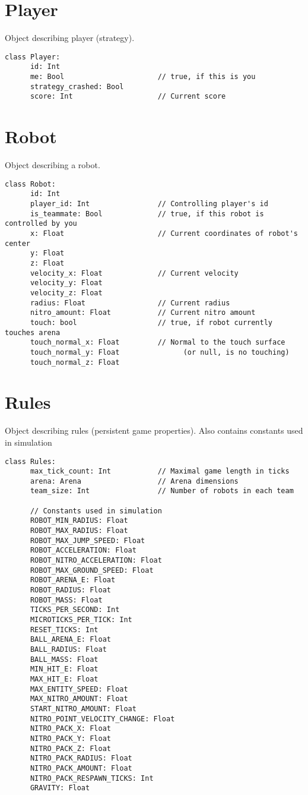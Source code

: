\section{Player}

Object describing player (strategy).

\begin{verbatim}
class Player:
      id: Int
      me: Bool                      // true, if this is you
      strategy_crashed: Bool
      score: Int                    // Current score
\end{verbatim}

\section{Robot}

Object describing a robot.

\begin{verbatim}
class Robot:
      id: Int
      player_id: Int                // Controlling player's id
      is_teammate: Bool             // true, if this robot is controlled by you
      x: Float                      // Current coordinates of robot's center
      y: Float
      z: Float
      velocity_x: Float             // Current velocity
      velocity_y: Float
      velocity_z: Float
      radius: Float                 // Current radius
      nitro_amount: Float           // Current nitro amount
      touch: bool                   // true, if robot currently touches arena
      touch_normal_x: Float         // Normal to the touch surface
      touch_normal_y: Float               (or null, is no touching)
      touch_normal_z: Float
\end{verbatim}

\section{Rules}

Object describing rules (persistent game properties). Also contains constants used in simulation

\begin{verbatim}
class Rules:
      max_tick_count: Int           // Maximal game length in ticks
      arena: Arena                  // Arena dimensions
      team_size: Int                // Number of robots in each team

      // Constants used in simulation
      ROBOT_MIN_RADIUS: Float
      ROBOT_MAX_RADIUS: Float
      ROBOT_MAX_JUMP_SPEED: Float
      ROBOT_ACCELERATION: Float
      ROBOT_NITRO_ACCELERATION: Float
      ROBOT_MAX_GROUND_SPEED: Float
      ROBOT_ARENA_E: Float
      ROBOT_RADIUS: Float
      ROBOT_MASS: Float
      TICKS_PER_SECOND: Int
      MICROTICKS_PER_TICK: Int
      RESET_TICKS: Int
      BALL_ARENA_E: Float
      BALL_RADIUS: Float
      BALL_MASS: Float
      MIN_HIT_E: Float
      MAX_HIT_E: Float
      MAX_ENTITY_SPEED: Float
      MAX_NITRO_AMOUNT: Float
      START_NITRO_AMOUNT: Float
      NITRO_POINT_VELOCITY_CHANGE: Float
      NITRO_PACK_X: Float
      NITRO_PACK_Y: Float
      NITRO_PACK_Z: Float
      NITRO_PACK_RADIUS: Float
      NITRO_PACK_AMOUNT: Float
      NITRO_PACK_RESPAWN_TICKS: Int
      GRAVITY: Float
\end{verbatim}